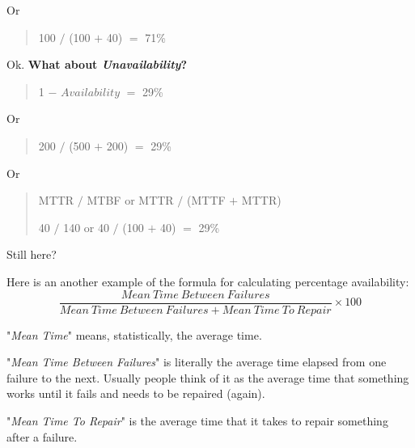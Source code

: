 Or

\begin{quote}
100 $/$ (100 $+$ 40)  $=$  71\%
\end{quote}

Ok. \textbf{What about \emph{Unavailability}?}

\begin{quote}
1  $-$  $Availability$  $=$  29\%
\end{quote}

Or
\begin{quote}
200  $/$  (500  $+$  200)  $=$  29\%
\end{quote}

Or

\begin{quote}
MTTR $/$ MTBF or MTTR $/$ (MTTF $+$ MTTR)

40 $/$ 140 or 40 $/$  (100  $+$ 40)  $=$  29\%
\end{quote}


Still here?

Here is an another example of the formula for calculating percentage availability: 
\begin{equation}\label{eq:Percentage Availability}
\frac{Mean~Time~Between~Failures}{Mean~Time~Between~Failures  +  Mean~Time~To~Repair} \times 100
\end{equation}

"\textit{Mean Time}" means, statistically, the average time.

"\textit{Mean Time Between Failures}" is literally the average time elapsed from one failure to the next.  Usually people think of it as the average time that something works until it fails and needs to be repaired (again).

"\textit{Mean Time To Repair}" is the average time that it takes to repair something after a failure.
